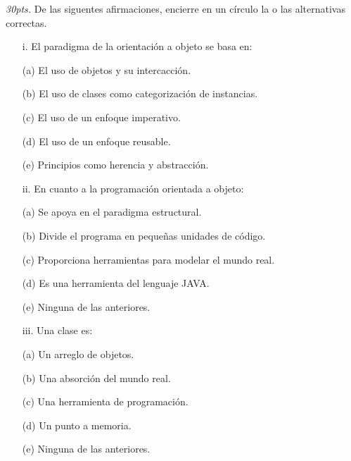 \documentclass[10pt]{article}
\begin{document}
\begin{enumerate}
   {\scriptsize
    \item \emph{30pts.} De las siguentes afirmaciones, encierre en un c\'irculo la o las alternativas correctas.
 
    \begin{multicols}{2}

    \begin{enumerate}[label=(\alph*)]
        \item[i.] El paradigma de la orientaci\'on a objeto se basa en:
        \item[(a)] El uso de objetos y su intercacci\'on.
        \item[(b)] El uso de clases como categorizaci\'on de instancias.
        \item[(c)] El uso de un enfoque imperativo.
        \item[(d)] El uso de un enfoque reusable.
        \item[(e)] Principios como herencia y abstracci\'on.
    \end{enumerate}

    \begin{enumerate}[label=(\alph*)]
        \item[ii.] En cuanto a la programaci\'on orientada a objeto:
        \item[(a)] Se apoya en el paradigma estructural.
        \item[(b)] Divide el programa en peque\~nas unidades de c\'odigo.
        \item[(c)] Proporciona herramientas para modelar el mundo real.
        \item[(d)] Es una herramienta del lenguaje JAVA.
        \item[(e)] Ninguna de las anteriores.
    \end{enumerate}

    \begin{enumerate}[label=(\alph*)]
        \item[iii.] Una clase es: 
        \item[(a)] Un arreglo de objetos.
        \item[(b)] Una absorci\'on del mundo real.
        \item[(c)] Una herramienta de programaci\'on.
        \item[(d)] Un punto a memoria.
        \item[(e)] Ninguna de las anteriores.
    \end{enumerate}


\end{multicols}}
\end{enumerate}
\end{document}

